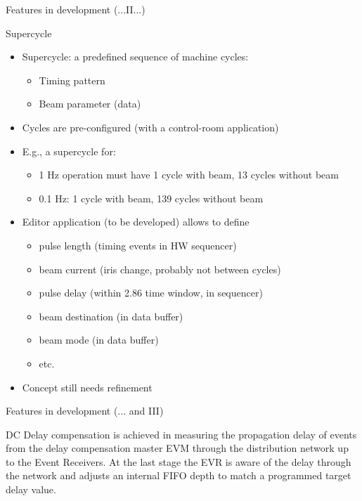 \documentclass[
  9pt
  , table
  , ignorenonframetext
]{beamer}
\begin{document}
\begin{frame}{Features in development (...II...)}
  \begin{block}{Supercycle}
    \begin{itemize}
      \item Supercycle: a predefined sequence of machine cycles:
      \begin{itemize}
        \item Timing pattern
        \item Beam parameter (data)
      \end{itemize}
      \item Cycles are pre-configured (with a control-room application)
      \item E.g., a supercycle for:
      \begin{itemize}
        \item 1 Hz operation must have 1 cycle with beam, 13 cycles without beam
        \item 0.1 Hz: 1 cycle with beam,  139 cycles without beam
      \end{itemize}
      \item Editor application (to be developed) allows to define
      \begin{itemize}
        \item pulse length (timing events in HW sequencer)
        \item beam current (iris change, probably not between cycles)
        \item pulse delay (within 2.86 time window, in sequencer)
        \item beam destination (in data buffer)
        \item beam mode (in data buffer)
        \item etc.
      \end{itemize}
      \item Concept still needs refinement
    \end{itemize}
  \end{block}
\end{frame}

\begin{frame}{Features in development (... and III)}
  \begin{block}{DC}
    Delay compensation is achieved in measuring the propagation delay of events from the delay compensation master EVM through the distribution network up to the Event Receivers. At the last stage the EVR is aware of the delay through the network and adjusts an internal FIFO depth to match a programmed target delay value.
  \end{block}
\end{frame}
\end{document}
